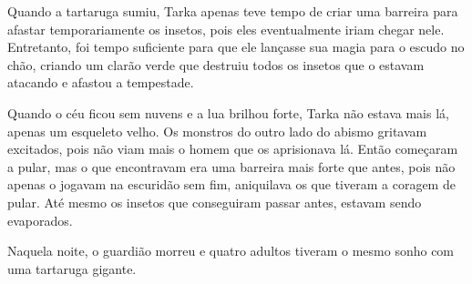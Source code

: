 Quando a tartaruga sumiu, Tarka apenas teve tempo de criar uma barreira para afastar temporariamente os insetos, pois eles eventualmente iriam chegar nele. Entretanto, foi tempo suficiente para que ele lançasse sua magia para o escudo no chão, criando um clarão verde que destruiu todos os insetos que o estavam atacando e afastou a tempestade. 

Quando o céu ficou sem nuvens e a lua brilhou forte, Tarka não estava mais lá, apenas um esqueleto velho. Os monstros do outro lado do abismo gritavam excitados, pois não viam mais o homem que os aprisionava lá. Então começaram a pular, mas o que encontravam era uma barreira mais forte que antes, pois não apenas o jogavam na escuridão sem fim, aniquilava os que tiveram a coragem de pular. Até mesmo os insetos que conseguiram passar antes, estavam sendo evaporados. 

Naquela noite, o guardião morreu e quatro adultos tiveram o mesmo sonho com uma tartaruga gigante.

